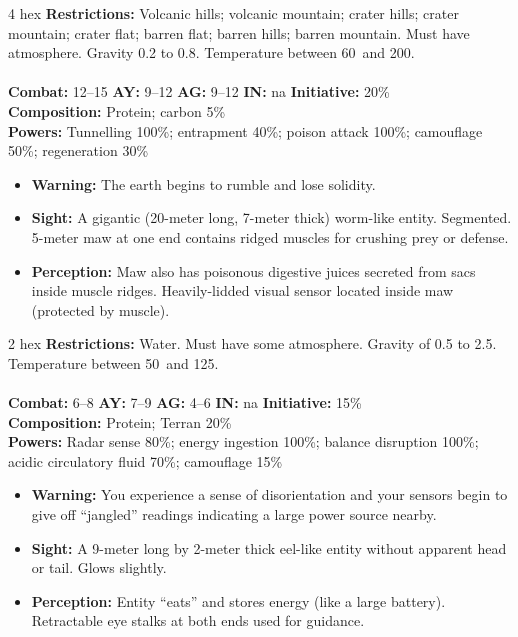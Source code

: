 \hrulefill

\begin{creature}{4 hex}
\textbf{Restrictions:} Volcanic hills; volcanic mountain; crater hills; crater mountain; crater flat; barren flat; barren hills; barren mountain. Must 
have atmosphere. Gravity 0.2 to 0.8. Temperature between 60\textdegree\ and 200\textdegree. \\\\
\textbf{Combat:} 12--15 \textbf{AY:} 9--12 \textbf{AG:} 9--12 \textbf{IN:} na \textbf{Initiative:} 20\% \\
\textbf{Composition:} Protein; carbon 5\% \\
\textbf{Powers:} Tunnelling 100\%; entrapment 40\%; poison attack 100\%; camouflage 50\%; regeneration 30\% 
\begin{itemize}
\item \textbf{Warning:} The earth begins to rumble and lose solidity. 
\item \textbf{Sight:} A gigantic (20-meter long, 7-meter thick) worm-like entity. Segmented. 5-meter maw at one end contains ridged muscles for 
crushing prey or defense. 
\item \textbf{Perception:} Maw also has poisonous digestive juices secreted from sacs inside muscle ridges. Heavily-lidded visual sensor located 
inside maw (protected by muscle). 
\end{itemize}
\end{creature}

\hrulefill

\begin{creature}{2 hex}
\textbf{Restrictions:} Water. Must have some atmosphere. Gravity of 0.5 to 2.5. Temperature between 50\textdegree\ and 125\textdegree. \\\\
\textbf{Combat:} 6--8 \textbf{AY:} 7--9 \textbf{AG:} 4--6 \textbf{IN:} na \textbf{Initiative:} 15\% \\
\textbf{Composition:} Protein; Terran 20\% \\
\textbf{Powers:} Radar sense 80\%; energy ingestion 100\%; balance disruption 100\%; acidic circulatory fluid 70\%; camouflage 15\% 
\begin{itemize}
\item \textbf{Warning:} You experience a sense of disorientation and your sensors begin to give off ``jangled'' readings indicating a large power 
source nearby. 
\item \textbf{Sight:} A 9-meter long by 2-meter thick eel-like entity without apparent head or tail. Glows slightly. 
\item \textbf{Perception:} Entity ``eats'' and stores energy (like a large battery). Retractable eye stalks at both ends used for guidance. 
\end{itemize}
\end{creature}

